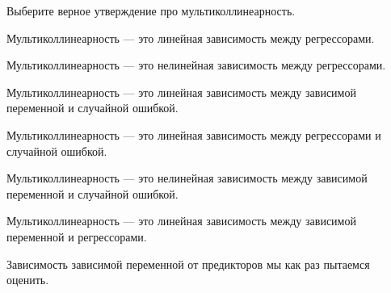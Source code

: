 
\begin{question}
Выберите верное утверждение про мультиколлинеарность.
\begin{answerlist}
  \item Мультиколлинеарность --- это линейная зависимость между регрессорами.
  \item Мультиколлинеарность --- это нелинейная зависимость между регрессорами.
  \item Мультиколлинеарность --- это линейная зависимость между зависимой переменной и случайной ошибкой.
  \item Мультиколлинеарность --- это линейная зависимость между регрессорами и случайной ошибкой.
  \item Мультиколлинеарность --- это нелинейная зависимость между зависимой переменной и случайной ошибкой.
  \item Мультиколлинеарность --- это линейная зависимость между зависимой переменной и регрессорами.
\end{answerlist}
\end{question}

\begin{solution}
Зависимость зависимой переменной от предикторов мы как раз пытаемся оценить.
\end{solution}

